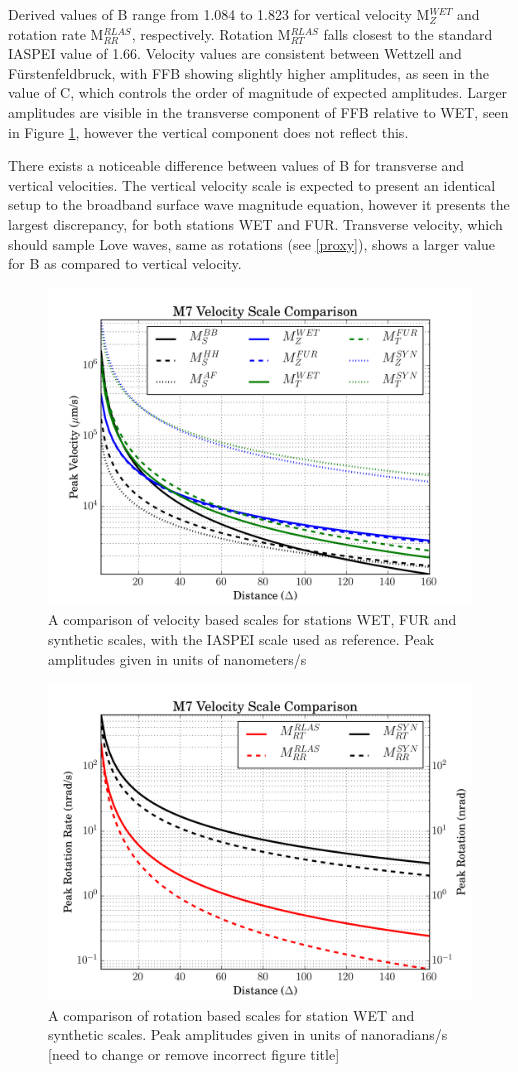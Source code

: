 \documentclass{gji}
\begin{document}
Derived values of B range from 1.084 to 1.823 for vertical velocity M$^{WET}_{Z}$ and rotation rate M$^{RLAS}_{RR}$, respectively. Rotation M$^{RLAS}_{RT}$ falls closest to the standard IASPEI value of 1.66. Velocity values are consistent between Wettzell and F\"urstenfeldbruck, with FFB showing slightly higher amplitudes, as seen in the value of C, which controls the order of magnitude of expected amplitudes. Larger amplitudes are visible in the transverse component of FFB relative to WET, seen in Figure \ref{fig:vel_scale}, however the vertical component does not reflect this. 

There exists a noticeable difference between values of B for transverse and vertical velocities. The vertical velocity scale is expected to present an identical setup to the broadband surface wave magnitude equation, however it presents the largest discrepancy, for both stations WET and FUR. Transverse velocity, which should sample Love waves, same as rotations (see \ref{proxy}), shows a larger value for B as compared to vertical velocity.

\begin{figure}
\centerline{\includegraphics[width=.5\textwidth]{velocityscales}}
\caption{A comparison of velocity based scales for stations WET, FUR and synthetic scales, with the IASPEI scale used as reference. Peak amplitudes given in units of nanometers/s}
\label{fig:vel_scale}
\end{figure}

\begin{figure}
\centerline{\includegraphics[width=.5\textwidth]{rrscales}}
\caption{A comparison of rotation based scales for station WET and synthetic scales. Peak amplitudes given in units of nanoradians/s [need to change or remove incorrect figure title]}
\label{fig:rr_scale}
\end{figure}
\end{document}
